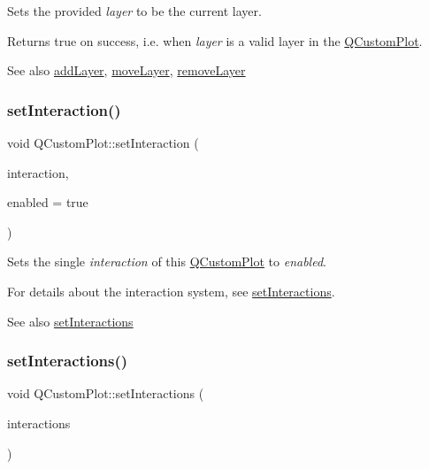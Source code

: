 Sets the provided {\itshape layer} to be the current layer.

Returns true on success, i.\+e. when {\itshape layer} is a valid layer in the \hyperlink{class_q_custom_plot}{Q\+Custom\+Plot}.

\begin{DoxySeeAlso}{See also}
\hyperlink{class_q_custom_plot_ad5255393df078448bb6ac83fa5db5f52}{add\+Layer}, \hyperlink{class_q_custom_plot_ae896140beff19424e9e9e02d6e331104}{move\+Layer}, \hyperlink{class_q_custom_plot_a40f75e342c5eaab6a86066a42a0e2a94}{remove\+Layer} 
\end{DoxySeeAlso}
\mbox{\label{class_q_custom_plot_a422bf1bc6d56dac75a3d805d9a65902c}} 
\subsubsection{\texorpdfstring{set\+Interaction()}{setInteraction()}}
{\footnotesize\ttfamily void Q\+Custom\+Plot\+::set\+Interaction (\begin{DoxyParamCaption}\item[{const \hyperlink{namespace_q_c_p_a2ad6bb6281c7c2d593d4277b44c2b037}{Q\+C\+P\+::\+Interaction} \&}]{interaction,  }\item[{bool}]{enabled = {\ttfamily true} }\end{DoxyParamCaption})}

Sets the single {\itshape interaction} of this \hyperlink{class_q_custom_plot}{Q\+Custom\+Plot} to {\itshape enabled}.

For details about the interaction system, see \hyperlink{class_q_custom_plot_a5ee1e2f6ae27419deca53e75907c27e5}{set\+Interactions}.

\begin{DoxySeeAlso}{See also}
\hyperlink{class_q_custom_plot_a5ee1e2f6ae27419deca53e75907c27e5}{set\+Interactions} 
\end{DoxySeeAlso}
\mbox{\label{class_q_custom_plot_a5ee1e2f6ae27419deca53e75907c27e5}} 
\subsubsection{\texorpdfstring{set\+Interactions()}{setInteractions()}}
{\footnotesize\ttfamily void Q\+Custom\+Plot\+::set\+Interactions (\begin{DoxyParamCaption}\item[{const Q\+C\+P\+::\+Interactions \&}]{interactions }\end{DoxyParamCaption})}

